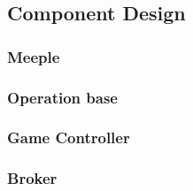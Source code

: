 \documentclass[../main.tex]{subfiles}
\begin{document}
\subsection{Component Design}

\subsubsection{Meeple}

\subsubsection{Operation base}

\subsubsection{Game Controller}

\subsubsection{Broker}
\end{document}
